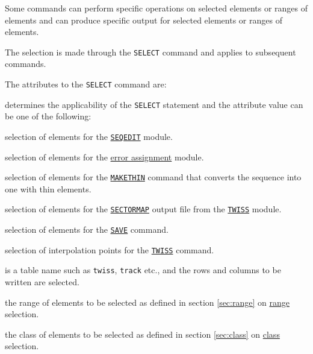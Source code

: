 Some \madx commands can perform specific operations on selected elements
or ranges of elements and can produce specific output for selected
elements or ranges of elements. 

The selection is made through the \texttt{SELECT} command and applies to
subsequent commands.


The attributes to the \texttt{SELECT} command are:
\begin{madlist}
   determines the applicability of the \texttt{SELECT}
  statement and the attribute value can be one of the following: 
  \begin{madlist}
     selection of elements for the
    \hyperref[sec:seqedit]{\texttt{SEQEDIT}} module.
    
     selection of elements for the
    \hyperref[chap:error]{error assignment} module.
    
     selection of elements for the
    \hyperref[chap:makethin]{\texttt{MAKETHIN}} command that
    converts the sequence into one with thin elements.
    
     selection of elements for the
    \hyperref[sec:sectormap]{\texttt{SECTORMAP}} output file
    from the \hyperref[chap:twiss]{\texttt{TWISS}} module.
    
     selection of elements for the
    \hyperref[sec:save]{\texttt{SAVE}} command.

     selection of interpolation points for the
    \hyperref[chap:twiss]{\texttt{TWISS}} command.

     is a table name such as \texttt{twiss}, 
    \texttt{track} etc., and the rows and columns to be written are
    selected.
  \end{madlist} 
  
   the range of elements to be selected as defined in
  section \ref{sec:range} on \hyperref[sec:range]{range} selection.

   the class of elements to be selected as defined in
  section \ref{sec:class} on \hyperref[sec:class]{class} selection.


\end{madlist}
